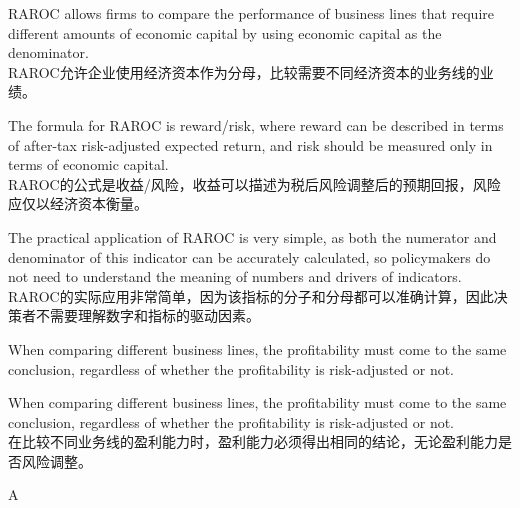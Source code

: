 \documentclass{article}
\begin{document}
    \begin{choices}
        \item RAROC allows firms to compare the performance of business lines that require different amounts of economic capital by using economic capital as the denominator. \\
        RAROC允许企业使用经济资本作为分母，比较需要不同经济资本的业务线的业绩。
        \item The formula for RAROC is reward/risk, where reward can be described in terms of after-tax risk-adjusted expected return, and risk should be measured only in terms of economic capital. \\
        RAROC的公式是收益/风险，收益可以描述为税后风险调整后的预期回报，风险应仅以经济资本衡量。
        \item The practical application of RAROC is very simple, as both the numerator and denominator of this indicator can be accurately calculated, so policymakers do not need to understand the meaning of numbers and drivers of indicators. \\
        RAROC的实际应用非常简单，因为该指标的分子和分母都可以准确计算，因此决策者不需要理解数字和指标的驱动因素。
        \item When comparing different business lines, the profitability must come to the same conclusion, regardless of whether the profitability is risk-adjusted or not.
        \item When comparing different business lines, the profitability must come to the same conclusion, regardless of whether the profitability is risk-adjusted or not. \\
        在比较不同业务线的盈利能力时，盈利能力必须得出相同的结论，无论盈利能力是否风险调整。
    \end{choices}
    \begin{correctanswer}
        A
    \end{correctanswer}
\end{document}
